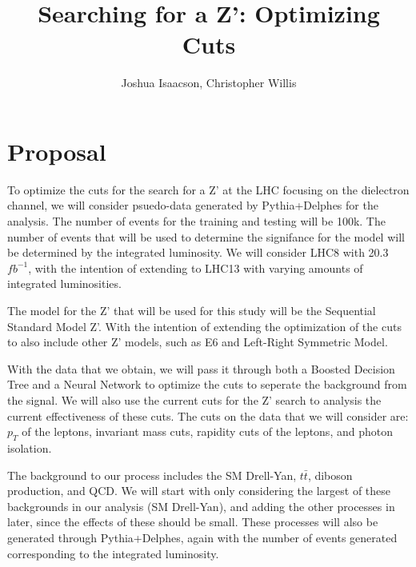 \documentclass[]{article}
\begin{document}
\title{Searching for a Z': Optimizing Cuts}

\author{Joshua Isaacson, Christopher Willis}


\maketitle


\section{Proposal}
To optimize the cuts for the search for a Z' at the LHC focusing on the dielectron channel, we will consider psuedo-data generated by Pythia+Delphes for the analysis. The number of
events for the training and testing will be 100k. The number of events that will be used to determine the signifance for the model will be determined by the integrated luminosity.
We will consider LHC8 with 20.3 $fb^{-1}$, with the intention of extending to LHC13 with varying amounts of integrated luminosities.

The model for the Z' that will be used for this study will be the Sequential Standard Model Z'. With the intention of extending the optimization of the cuts to 
also include other Z' models, such as E6 and Left-Right Symmetric Model.

With the data that we obtain, we will pass it through both a Boosted Decision Tree and a Neural Network to optimize the cuts to 
seperate the background from the signal. We will also use the current cuts for the Z' search to analysis the current effectiveness
of these cuts. The cuts on the data that we will consider are: $p_T$ of the leptons, invariant mass cuts, rapidity cuts of the leptons, and photon isolation.

The background to our process includes the SM Drell-Yan, $t\bar{t}$, diboson production, and QCD. We will start with only considering the largest
of these backgrounds in our analysis (SM Drell-Yan), and adding the other processes in later, since the effects of these should be small.
These processes will also be generated through Pythia+Delphes, again with the number 
of events generated corresponding to the integrated luminosity.
\end{document}
